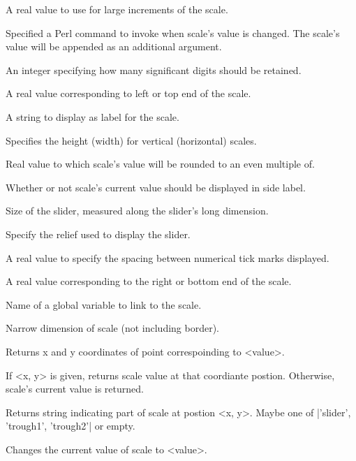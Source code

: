 \vskip5pt
\begin{enum}{1cm}

A real value to use for large increments of the scale.

Specified a Perl command to invoke when scale's value is changed.
The scale's value will be appended as an additional argument.

An integer specifying how many significant digits should be retained.

A real value corresponding to left or top end of the scale.

A string to display as label for the scale.

Specifies the height (width) for vertical (horizontal) scales.

Real value to which scale's value will be rounded to an even multiple of.

Whether or not scale's current value should be displayed in side label.

Size of the  slider, measured along the slider's long dimension.

Specify the relief used to display the slider.

A real value to specify the spacing between numerical tick marks displayed.

A real value corresponding to  the  right  or bottom end of the scale.

Name of a global variable to link to  the scale.

Narrow dimension of scale (not including border).

\end{enum}
\vskip5pt
\begin{enum}{1cm}

Returns x and y coordinates of point correspoinding to <value>.

If <x, y> is given, returns scale value at that coordiante postion.
Otherwise, scale's current value is returned.

Returns string indicating part of scale at postion <x, y>. Maybe one
of |'slider', 'trough1', 'trough2'| or empty.

Changes the current value of scale to <value>.

\end{enum}

